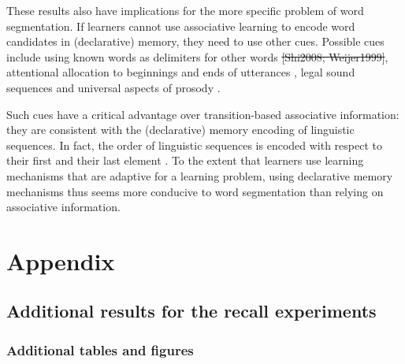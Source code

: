 \documentclass[
]{article}
\begin{document}
These results also have implications for the more specific problem of
word segmentation. If learners cannot use associative learning to encode
word candidates in (declarative) memory, they need to use other cues.
Possible cues include using known words as delimiters for other words
\citep{Bortfeld2005, Brent2001, Mersad2012} \sout{{[}Shi2008;
Weijer1999{]}}, attentional allocation to beginnings and ends of
utterances \citep{Monaghan2010, Seidl2008, Shukla2011}, legal sound
sequences \citep{McQueen1998, Salverda2007} and universal aspects of
prosody
\citep{Brentari2011, Christophe2001, Endress-cross-seg, Fenlon2008, Johnson2009, Pilon1981}.

Such cues have a critical advantage over transition-based associative
information: they are consistent with the (declarative) memory encoding
of linguistic sequences. In fact, the order of linguistic sequences is
encoded with respect to their first and their last element
\citep{Endress-Phantoms-Vision, Fischer-Baum2011}. To the extent that
learners use learning mechanisms that are adaptive for a learning
problem, using declarative memory mechanisms thus seems more conducive
to word segmentation than relying on associative information.

\clearpage

\hypertarget{appendix}{%
\section{Appendix}\label{appendix}}

\hypertarget{additional-results-for-the-recall-experiments}{%
\subsection{Additional results for the recall
experiments}\label{additional-results-for-the-recall-experiments}}

\hypertarget{additional-tables-and-figures}{%
\subsubsection{Additional tables and
figures}\label{additional-tables-and-figures}}
\end{document}
